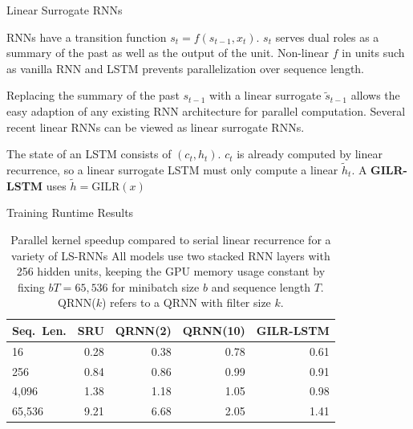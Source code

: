 \documentclass[final]{beamer}
\newlength{\onecolwid}
\begin{document}
\begin{frame}[t]
\begin{columns}[t]
\begin{column}{\onecolwid} %


\begin{block}{Linear Surrogate RNNs}

RNNs have a transition function $s_t = f(s_{t-1},x_t)$. $s_t$ serves dual roles as a
summary of the past as well as the output of the unit. Non-linear $f$ in units such
as vanilla RNN and LSTM prevents parallelization over sequence length.
\vspace{1ex}

Replacing the summary of the past $s_{t-1}$ with a linear surrogate $\tilde{s}_{t-1}$
allows the easy adaption of any existing RNN architecture for parallel computation.
Several recent linear RNNs can be viewed as linear surrogate RNNs.
\vspace{1ex}

The state of an LSTM consists of $(c_t, h_t)$. $c_t$ is already computed
by linear recurrence, so a linear surrogate LSTM must only compute a
linear $\tilde{h}_t$. A \textbf{GILR-LSTM} uses $\tilde{h} = \text{GILR}(x)$
\end{block}



\begin{block}{Training Runtime Results}
\begin{table}[t]
\begin{center}
\begin{tabular}{lrrrr}
\label{table:rnn-throughput}
\small{Seq.\ Len.} & \small{SRU} & \small{QRNN(2)}
  & \small{QRNN(10)} & \small{GILR-LSTM}\\ \midrule
16 & 0.28 & 0.38 & 0.78 & 0.61\\
256 & 0.84 & 0.86 & 0.99 & 0.91\\
4,096 & 1.38 & 1.18 & 1.05 & 0.98\\
65,536 & 9.21 & 6.68 & 2.05 & 1.41\\ \bottomrule
\end{tabular}
\end{center}
\vspace{2ex}
\caption{Parallel kernel speedup compared to serial linear recurrence for a variety of LS-RNNs
  All models use two stacked RNN layers with 256 hidden
  units, keeping the GPU memory usage constant by fixing $bT = 65,536$
  for minibatch size $b$ and sequence length $T$. QRNN($k$) refers to a
  QRNN with filter size $k$. %
}
\end{table}
\end{block}


\end{column}
\end{columns}
\end{frame}
\end{document}

